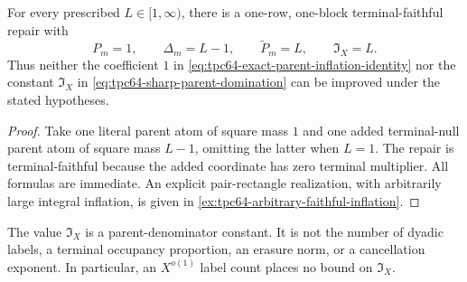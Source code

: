 \begin{proposition}
\label{prop:tpc64-inflation-sharpness}
For every prescribed \(L\in[1,\infty)\), there is a one-row,
one-block terminal-faithful repair with
\begin{equation}
 P_m=1,\qquad
 \Delta_m=L-1,\qquad
 \widetilde P_m=L,\qquad
 \mathfrak I_X=L.
 \label{eq:tpc64-prescribed-inflation-model}
\end{equation}
Thus neither the coefficient \(1\) in
\eqref{eq:tpc64-exact-parent-inflation-identity} nor the constant
\(\mathfrak I_X\) in \eqref{eq:tpc64-sharp-parent-domination} can be
improved under the stated hypotheses.
\end{proposition}

\begin{proof}
Take one literal parent atom of square mass \(1\) and one added
terminal-null parent atom of square mass \(L-1\), omitting the latter when
\(L=1\).  The repair is terminal-faithful because the added coordinate
has zero terminal multiplier.  All formulas are immediate.  An explicit
pair-rectangle realization, with arbitrarily large integral inflation, is
given in \cref{ex:tpc64-arbitrary-faithful-inflation}.
\end{proof}

The value \(\mathfrak I_X\) is a parent-denominator constant.  It is not
the number of dyadic labels, a terminal occupancy proportion, an erasure
norm, or a cancellation exponent.  In particular, an \(X^{o(1)}\) label
count places no bound on \(\mathfrak I_X\).
